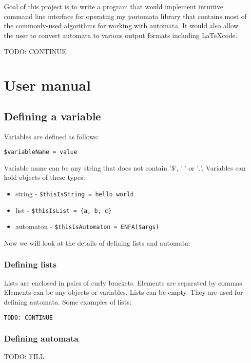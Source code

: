 \documentclass{ctuthesis}
\begin{document}
Goal of this project is to write a program that would implement intuitive command line interface for operating my jautomata library that contains most of the commonly-used algorithms for working with automata. It would also allow the user to convert automata to various output formats including \LaTeX code.

TODO: CONTINUE

\chapter{User manual}
\section{Defining a variable}
Variables are defined as follows:
\begin{verbatim}
$variableName = value
\end{verbatim}

Variable name can be any string that does not contain '$\$$', '$\ $' or '$.$'. Variables can hold objects of these types:
\begin{itemize}
	\item string - \verb'$thisIsString = hello world'
	\item list - \verb'$thisIsList = {a, b, c}'
	\item automaton - \verb'$thisIsAutomaton = ENFA($args)'
\end{itemize}

Now we will look at the details of defining lists and automata:

\subsection{Defining lists}
Lists are enclosed in pairs of curly brackets. Elements are separated by commas. Elements can be any objects or variables. Lists can be empty. They are used for defining automata. Some examples of lists:

\begin{minipage}{\linewidth}
\begin{lstlisting}[language = JASL]
    TODO: CONTINUE
\end{lstlisting}
\end{minipage}

\subsection{Defining automata}
TODO: FILL
\end{document}
